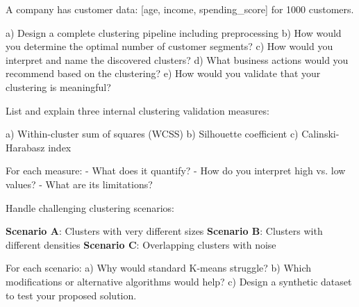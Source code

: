 \documentclass{article}
\newcounter{exercise}
\begin{document}
\begin{tcolorbox}[colback=gray!5!white,colframe=gray!75!black,title=Problem \stepcounter{exercise}: Market Segmentation Application]

A company has customer data: [age, income, spending_score] for 1000 customers.

a) Design a complete clustering pipeline including preprocessing
b) How would you determine the optimal number of customer segments?
c) How would you interpret and name the discovered clusters?
d) What business actions would you recommend based on the clustering?
e) How would you validate that your clustering is meaningful?
\end{tcolorbox}

\begin{tcolorbox}[colback=gray!5!white,colframe=gray!75!black,title=Problem \stepcounter{exercise}: Clustering Validation Methods]

List and explain three internal clustering validation measures:

a) Within-cluster sum of squares (WCSS)
b) Silhouette coefficient
c) Calinski-Harabasz index

For each measure:
- What does it quantify?
- How do you interpret high vs. low values?
- What are its limitations?
\end{tcolorbox}

\begin{tcolorbox}[colback=gray!5!white,colframe=gray!75!black,title=Problem \stepcounter{exercise}: Advanced Clustering Scenarios]

Handle challenging clustering scenarios:

\textbf{Scenario A}: Clusters with very different sizes
\textbf{Scenario B}: Clusters with different densities  
\textbf{Scenario C}: Overlapping clusters with noise

For each scenario:
a) Why would standard K-means struggle?
b) Which modifications or alternative algorithms would help?
c) Design a synthetic dataset to test your proposed solution.
\end{tcolorbox}
\end{document}
